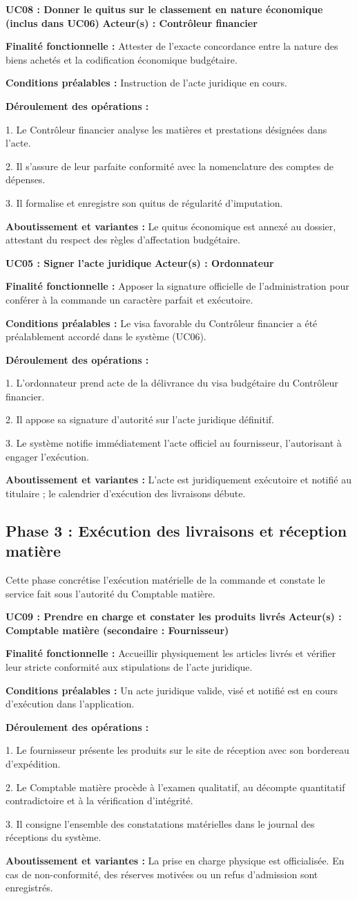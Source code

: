 \documentclass[11pt,a4paper]{article}
\newcommand{\ficheusecase}[6]{
  \vspace{0.45em}
  {\noindent\raggedright\textbf{\sffamily\normalsize\color{BleuInstitutionnel}#1} \hfill {\scriptsize\sffamily\bfseries\color{BleuSecondaire} Acteur(s) : #2}\par}
  \vspace{0.1em}
  {\small\textbf{Finalité fonctionnelle :} #3\par}
  {\small\textbf{Conditions préalables :} #4\par}
  {\small\textbf{Déroulement des opérations :}\par
  \vspace{0.05em}
  #5\par}
  \vspace{0.05em}
  {\small\color{BleuSecondaire}\textbf{Aboutissement et variantes :} #6\par}
  \vspace{0.35em}
}
\begin{document}
\ficheusecase{UC08 : Donner le quitus sur le classement en nature économique (inclus dans UC06)}
{Contrôleur financier}
{Attester de l'exacte concordance entre la nature des biens achetés et la codification économique budgétaire.}
{Instruction de l'acte juridique en cours.}
{1. Le Contrôleur financier analyse les matières et prestations désignées dans l'acte.\par
2. Il s'assure de leur parfaite conformité avec la nomenclature des comptes de dépenses.\par
3. Il formalise et enregistre son quitus de régularité d'imputation.}
{Le quitus économique est annexé au dossier, attestant du respect des règles d'affectation budgétaire.}

\ficheusecase{UC05 : Signer l'acte juridique}
{Ordonnateur}
{Apposer la signature officielle de l'administration pour conférer à la commande un caractère parfait et exécutoire.}
{Le visa favorable du Contrôleur financier a été préalablement accordé dans le système (UC06).}
{1. L'ordonnateur prend acte de la délivrance du visa budgétaire du Contrôleur financier.\par
2. Il appose sa signature d'autorité sur l'acte juridique définitif.\par
3. Le système notifie immédiatement l'acte officiel au fournisseur, l'autorisant à engager l'exécution.}
{L'acte est juridiquement exécutoire et notifié au titulaire ; le calendrier d'exécution des livraisons débute.}

\subsection{Phase 3 : Exécution des livraisons et réception matière}

Cette phase concrétise l'exécution matérielle de la commande et constate le service fait sous l'autorité du Comptable matière.

\ficheusecase{UC09 : Prendre en charge et constater les produits livrés}
{Comptable matière (secondaire : Fournisseur)}
{Accueillir physiquement les articles livrés et vérifier leur stricte conformité aux stipulations de l'acte juridique.}
{Un acte juridique valide, visé et notifié est en cours d'exécution dans l'application.}
{1. Le fournisseur présente les produits sur le site de réception avec son bordereau d'expédition.\par
2. Le Comptable matière procède à l'examen qualitatif, au décompte quantitatif contradictoire et à la vérification d'intégrité.\par
3. Il consigne l'ensemble des constatations matérielles dans le journal des réceptions du système.}
{La prise en charge physique est officialisée. En cas de non-conformité, des réserves motivées ou un refus d'admission sont enregistrés.}
\end{document}
